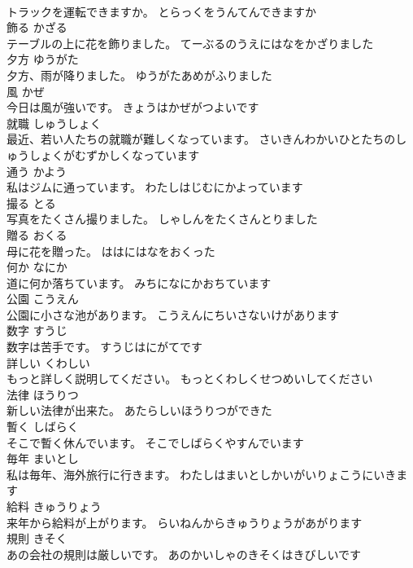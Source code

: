 \documentclass[8pt]{extreport}
\begin{document}
\begin{CJK}{UTF8}{min}
\\	トラックを運転できますか。	とらっくをうんてんできますか	
\\	飾る	かざる	
\\	テーブルの上に花を飾りました。	てーぶるのうえにはなをかざりました	
\\	夕方	ゆうがた	
\\	夕方、雨が降りました。	ゆうがたあめがふりました	
\\	風	かぜ	
\\	今日は風が強いです。	きょうはかぜがつよいです	
\\	就職	しゅうしょく	
\\	最近、若い人たちの就職が難しくなっています。	さいきんわかいひとたちのしゅうしょくがむずかしくなっています	
\\	通う	かよう	
\\	私はジムに通っています。	わたしはじむにかよっています	
\\	撮る	とる	
\\	写真をたくさん撮りました。	しゃしんをたくさんとりました	
\\	贈る	おくる	
\\	母に花を贈った。	ははにはなをおくった	
\\	何か	なにか	
\\	道に何か落ちています。	みちになにかおちています	
\\	公園	こうえん	
\\	公園に小さな池があります。	こうえんにちいさないけがあります	
\\	数字	すうじ	
\\	数字は苦手です。	すうじはにがてです	
\\	詳しい	くわしい	
\\	もっと詳しく説明してください。	もっとくわしくせつめいしてください	
\\	法律	ほうりつ	
\\	新しい法律が出来た。	あたらしいほうりつができた	
\\	暫く	しばらく	
\\	そこで暫く休んでいます。	そこでしばらくやすんでいます	
\\	毎年	まいとし	
\\	私は毎年、海外旅行に行きます。	わたしはまいとしかいがいりょこうにいきます	
\\	給料	きゅうりょう	
\\	来年から給料が上がります。	らいねんからきゅうりょうがあがります	
\\	規則	きそく	
\\	あの会社の規則は厳しいです。	あのかいしゃのきそくはきびしいです	

\end{CJK}
\end{document}
